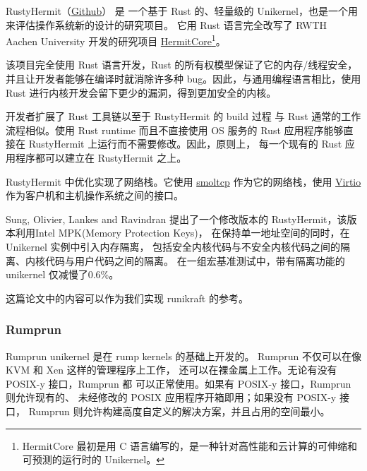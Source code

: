 \documentclass{../runikraft-report}
\begin{document}
RustyHermit（\href{https://github.com/hermitcore/rusty-hermit}{Github}） 是
一个基于 Rust 的、轻量级的 Unikernel，也是一个用来评估操作系统新的设计的研究项目。
它用 Rust 语言完全改写了 RWTH Aachen University
 开发的研究项目 \href{http://hermitcore.org/}{HermitCore}\footnote{HermitCore 最初是用 C 语言编写的，是一种针对高性能和云计算的可伸缩和可预测的运行时的 Unikernel。}。\cite{bib:14-rusty-hermit}

该项目完全使用 Rust 语言开发，Rust 的所有权模型保证了它的内存/线程安全，
并且让开发者能够在编译时就消除许多种 bug。因此，与通用编程语言相比，使用 Rust
 进行内核开发会留下更少的漏洞，得到更加安全的内核。

开发者扩展了 Rust 工具链以至于 RustyHermit 的 build 过程
与 Rust 通常的工作流程相似。使用 Rust runtime 而且不直接使用 OS 服务的
 Rust 应用程序能够直接在 RustyHermit 上运行而不需要修改。因此，原则上，
 每一个现有的 Rust 应用程序都可以建立在 RustyHermit 之上。\cite{bib:17-rusty-hermit2}


RustyHermit 中优化实现了网络栈。它使用 \href{https://github.com/smoltcp-rs/smoltcp}{smoltcp}
作为它的网络栈，使用 \href{https://www.linux-kvm.org/page/Virtio}{Virtio}
作为客户机和主机操作系统之间的接口。
%

Sung, Olivier, Lankes and Ravindran\cite{bib:18-intra-unikernel}
提出了一个修改版本的 RustyHermit，该版本利用Intel MPK(Memory Protection Keys)\cite{bib:19-mpk}，
在保持单一地址空间的同时，在 Unikernel 实例中引入内存隔离，
包括安全内核代码与不安全内核代码之间的隔离、内核代码与用户代码之间的隔离。
在一组宏基准测试中，带有隔离功能的 unikernel 仅减慢了0.6\%。

这篇论文中的内容可以作为我们实现 runikraft 的参考。

\subsubsection{Rumprun}

Rumprun unikernel 是在 rump kernels 的基础上开发的。
Rumprun 不仅可以在像 KVM 和 Xen 这样的管理程序上工作，
还可以在裸金属上工作。无论有没有 POSIX-y 接口，Rumprun 都
可以正常使用。如果有 POSIX-y 接口，Rumprun 则允许现有的、
未经修改的 POSIX 应用程序开箱即用；如果没有 POSIX-y 接口，
Rumprun 则允许构建高度自定义的解决方案，并且占用的空间最小。
\end{document}
